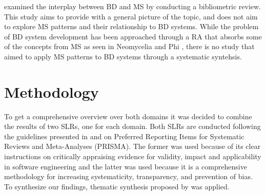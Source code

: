 \documentclass[a4paper,11pt,article,oneside]{memoir}
\begin{document}

\citet{staegemann2021examining} examined the interplay between BD and MS by conducting a bibliometric review. This study aims to provide with a general picture of the topic, and does not aim to explore MS patterns and their relationship to BD systems.  While the problem of BD system development has been approached through a RA that absorbs some of the concepts from MS as seen in Neomycelia \citep{ataei2021neomycelia} and Phi \citep{maamouri2021phi}, there is no study that aimed to apply MS patterns to BD systems through a systematic syntehsis.


\chapter{Methodology}

To get a comprehensive overview over both domains it was decided to combine the results of two SLRs, one for each domain. Both SLRs are conducted following the guidelines presented in \citet{Kitchenham.2004} and \citet{page2021prisma} on Preferred Reporting Items for Systematic Reviews and Meta-Analyses (PRISMA). The former was used because of its clear instructions on critically appraising evidence for validity, impact and applicability in software engineering and the latter was used because it is a comprehensive methodology for increasing systematicity, transparency, and prevention of bias. To synthesize our findings, thematic synthesis proposed by \citet{Cruzes.2011} was applied. 





\end{document}
